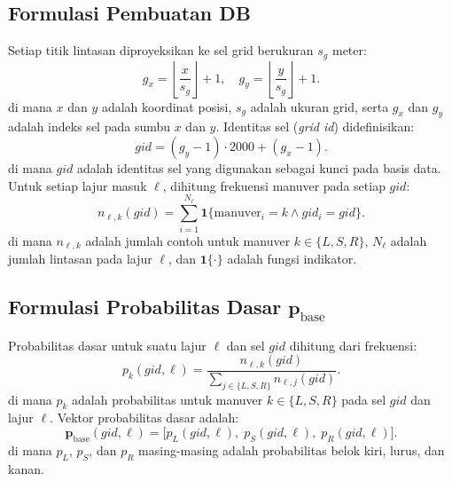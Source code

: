 \documentclass[conference]{IEEEtran}
\begin{document}
\subsection{Formulasi Pembuatan DB}
Setiap titik lintasan diproyeksikan ke sel grid berukuran $s_g$ meter:
\begin{equation}
g_x=\left\lfloor \frac{x}{s_g} \right\rfloor + 1,\quad
g_y=\left\lfloor \frac{y}{s_g} \right\rfloor + 1.
\end{equation}
di mana $x$ dan $y$ adalah koordinat posisi, $s_g$ adalah ukuran grid, serta $g_x$ dan $g_y$ adalah indeks sel pada sumbu $x$ dan $y$.
Identitas sel (\textit{grid id}) didefinisikan:
\begin{equation}
gid=(g_y-1)\cdot 2000 + (g_x-1).
\end{equation}
di mana $gid$ adalah identitas sel yang digunakan sebagai kunci pada basis data.
Untuk setiap lajur masuk $\ell$, dihitung frekuensi manuver pada setiap $gid$:
\begin{equation}
n_{\ell,k}(gid)=\sum_{i=1}^{N_\ell}\mathbf{1}\{ \text{manuver}_i = k \land gid_i = gid \}.
\end{equation}
di mana $n_{\ell,k}$ adalah jumlah contoh untuk manuver $k \in \{L,S,R\}$, $N_\ell$ adalah jumlah lintasan pada lajur $\ell$, dan $\mathbf{1}\{\cdot\}$ adalah fungsi indikator.

\subsection{Formulasi Probabilitas Dasar $\mathbf{p}_{\text{base}}$}
Probabilitas dasar untuk suatu lajur $\ell$ dan sel $gid$ dihitung dari frekuensi:
\begin{equation}
p_k(gid,\ell)=\frac{n_{\ell,k}(gid)}{\sum_{j \in \{L,S,R\}} n_{\ell,j}(gid)}.
\end{equation}
di mana $p_k$ adalah probabilitas untuk manuver $k \in \{L,S,R\}$ pada sel $gid$ dan lajur $\ell$.
Vektor probabilitas dasar adalah:
\begin{equation}
\mathbf{p}_{\text{base}}(gid,\ell)=\big[p_L(gid,\ell),\;p_S(gid,\ell),\;p_R(gid,\ell)\big].
\end{equation}
di mana $p_L$, $p_S$, dan $p_R$ masing-masing adalah probabilitas belok kiri, lurus, dan kanan.
\end{document}
